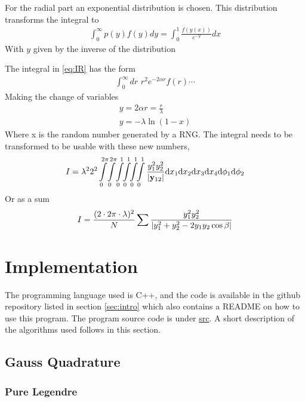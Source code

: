 \documentclass[11pt,a4paper,english,final]{article}
\numberwithin{equation}{section}
\newcommand{\ve}[1]{\mathbf{#1}} %
\newcommand{\di}{\mathrm{d}}
\begin{document}
For the radial part an exponential distribution is chosen.
This distribution transforms the integral to
\begin{gather}
\int_0^\infty p(y)f(y) dy = \int_0^1 \frac{f(y(x))}{e^{-y}} dx
\end{gather}
With $y$ given by the inverse of the distribution

The integral in \eqref{eq:IR} has the form
\begin{gather}
\int_0^\infty \!\! dr \,\, r^2e^{-2\alpha r} f(r)\cdots
\end{gather}
Making the change of variables
\begin{gather}
y = 2\alpha r = \frac{r}{\lambda}\\
y = -\lambda\ln(1-x)
\end{gather}
Where x is the random number generated by a RNG. The integral needs to 
be transformed to be usable with these new numbers,
\begin{gather}
I = \lambda^2 2^2
\int\limits_0^{2\pi} \! \int\limits_0^{2\pi} \!
\int\limits_0^1 \!\!\int\limits_0^1 \!\!\int\limits_0^1\!\!
\int\limits_0^1 
\frac{y_1^2y_2^2 }{\abs{\ve{y}_{12}}}
\di x_1 \di x_2 \di x_3 \di x_4 \di \phi_1 \di \phi_2
\end{gather}
Or as a sum 
\begin{gather}
I = \frac{(2\cdot 2\pi \cdot \lambda)^2}{N}\sum 
\frac{y_1^2y_2^2 }{\abs{y_1^2+y_2^2 -2y_1y_2\cos\beta}}
\end{gather}




\section{Implementation}

The programming language used is C++, and the code is available in the 
github repository listed in section \ref{sec:intro} which also 
contains a README on how to use this program. The program source 
code is under \url{src}. A short description of the algorithms used 
follows in this section.


\subsection{Gauss Quadrature}

\subsubsection{Pure Legendre}
\end{document}
